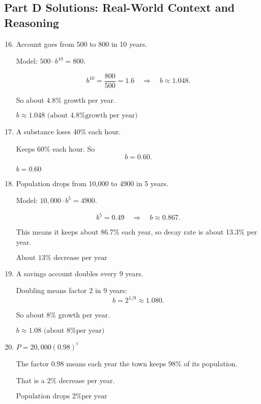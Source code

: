 \documentclass[12pt]{article}
\begin{document}
\subsection*{Part D Solutions: Real-World Context and Reasoning}
\begin{enumerate}
  \setcounter{enumi}{15}
  \item Account goes from 500 to 800 in 10 years.

  Model: \(500 \cdot b^{10} = 800.\)

  \[
  b^{10} = \frac{800}{500} = 1.6
  \quad \Rightarrow \quad
  b \approx 1.048.
  \]

  So about \(4.8\%\) growth per year.

  \(\boxed{b \approx 1.048 \text{ (about 4.8\% growth per year)}}\)

  \item A substance loses 40\% each hour.

  Keeps 60\% each hour. So
  \[
  b = 0.60.
  \]

  \(\boxed{b = 0.60}\)

  \item Population drops from 10{,}000 to 4900 in 5 years.

  Model: \(10{,}000 \cdot b^5 = 4900.\)

  \[
  b^5 = 0.49 \quad \Rightarrow \quad b \approx 0.867.
  \]

  This means it keeps about 86.7\% each year, so decay rate is about 13.3\% per year.

  \(\boxed{\text{About } 13\% \text{ decrease per year}}\)

  \item A savings account doubles every 9 years.

  Doubling means factor 2 in 9 years:
  \[
  b = 2^{1/9} \approx 1.080.
  \]

  So about 8\% growth per year.

  \(\boxed{b \approx 1.08 \text{ (about 8\% per year)}}\)

  \item \(P = 20{,}000(0.98)^t\)

  The factor 0.98 means each year the town keeps 98\% of its population.

  That is a 2\% decrease per year.

  \(\boxed{\text{Population drops 2\% per year}}\)
\end{enumerate}
\end{document}
